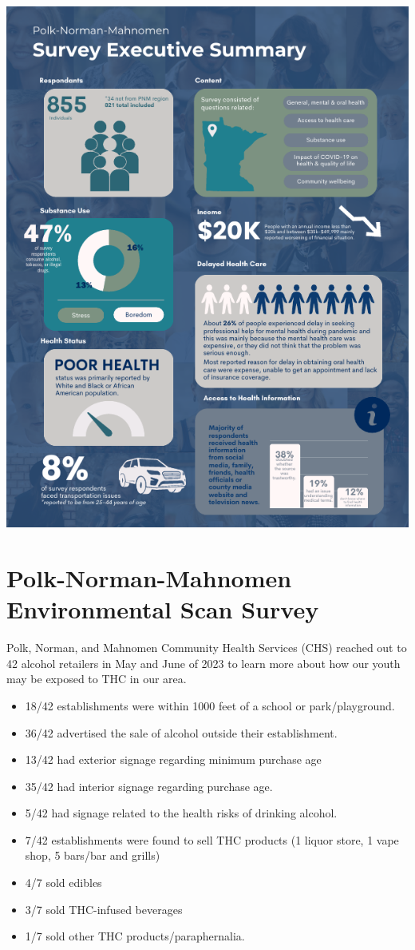 \documentclass[
  a4paper,
  landscape]{scrreprt}
\begin{document}
\includegraphics{pages/Attachments/localInput/surveyExeSummary.png}

\section{Polk-Norman-Mahnomen Environmental Scan
Survey}\label{polk-norman-mahnomen-environmental-scan-survey}

Polk, Norman, and Mahnomen Community Health Services (CHS) reached out
to 42 alcohol retailers in May and June of 2023 to learn more about how
our youth may be exposed to THC in our area.

\begin{itemize}
\item
  18/42 establishments were within 1000 feet of a school or
  park/playground.
\item
  36/42 advertised the sale of alcohol outside their establishment.
\item
  13/42 had exterior signage regarding minimum purchase age
\item
  35/42 had interior signage regarding purchase age.
\item
  5/42 had signage related to the health risks of drinking alcohol.
\item
  7/42 establishments were found to sell THC products (1 liquor store, 1
  vape shop, 5 bars/bar and grills)
\item
  4/7 sold edibles
\item
  3/7 sold THC-infused beverages
\item
  1/7 sold other THC products/paraphernalia.
\end{itemize}
\end{document}
